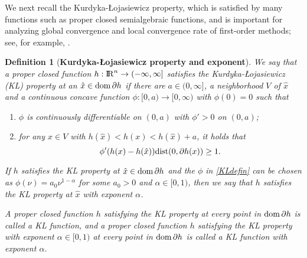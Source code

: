 \documentclass[10pt]{article}
\numberwithin{equation}{section}
\newtheorem{definition}{Definition}[section]
\def\R{{\rm I\!R}}
\def\d{{\rm dist}}
\def\dom{{\rm dom}\,}
\begin{document}
We next recall the Kurdyka-{\L}ojasiewicz property, which is satisfied by many functions such as proper closed semialgebraic functions, and is important for analyzing global convergence and local convergence rate of first-order methods; see, for example, \cite{AtBo09,AtBR10,AtBS13,BoST14,LiPong18}.
\begin{definition}[{{\bf Kurdyka-{\L}ojasiewicz property and exponent}}]
We say that a proper closed function $h:\R^n\to (-\infty, \infty]$ satisfies the Kurdyka-{\L}ojasiewicz (KL) property at an $\hat{x}\in\dom\partial h$ if there are $a\in(0,\infty]$, a neighborhood $V$ of $\hat{x}$ and a continuous concave function $\phi:[0,a)\to [0, \infty)$ with $\phi(0) = 0$ such that
\begin{enumerate}[{\rm (i)}]
  \item $\phi$ is continuously differentiable on $(0, a)$ with $\phi' >0$ on $(0, a)$;
  \item for any $x\in V$ with $h(\hat{x}) < h(x) < h(\hat{x}) + a$, it holds that
      \begin{equation}\label{KLdefin}
      \phi'(h(x) - h(\hat{x}))\d(0, \partial h(x)) \geq 1.
      \end{equation}
\end{enumerate}
If $h$ satisfies the KL property at $\hat{x}\in\dom\partial h$ and the $\phi$ in \eqref{KLdefin} can be chosen as $\phi(\nu) = a_0\nu^{1 - \alpha}$ for some $a_0 > 0$ and $\alpha\in [0, 1)$, then we say that $h$ satisfies the KL property at $\hat{x}$ with exponent $\alpha$.

A proper closed function $h$ satisfying the KL property at every point in $\dom\partial h$ is called a KL function, and a proper closed function $h$ satisfying the KL property with exponent $\alpha\in[0,1)$ at every point in $\dom\partial h$ is called a KL function with exponent $\alpha$.
\end{definition}
\end{document}
